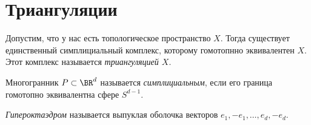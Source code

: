 \section{Триангуляции}

Допустим, что у нас есть топологическое пространство $X$. Тогда существует единственный симплициальный комплекс, которому гомотопнно эквивалентен $X$. Этот комплекс называется \emph{триангуляцией $X$}.

\begin{definition}
	Многогранник $P \subset \BR^d$ называется \emph{симплициальным}, если его граница гомотопно эквивалентна сфере $S^{d-1}$. 
\end{definition}

\begin{definition}
	\emph{Гипероктаэдром} называется выпуклая оболочка векторов $e_1, -e_1, \dots, e_d, -e_d$.
\end{definition}
